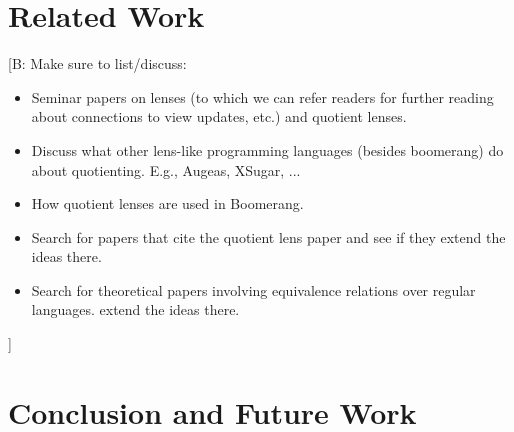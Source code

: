 \documentclass{svproc}
\newcommand{\FINISH}[3]{\ifdraft\textcolor{#1}{[#2: #3]}\fi}
\newcommand{\bcp}[1]{\FINISH{dkred}{B}{#1}}
\begin{document}
\section{Related Work}
\label{relwork}

\bcp{Make sure to list/discuss:
  \begin{itemize}
  \item Seminar papers on lenses (to which we can refer readers for further
    reading about connections to view updates, etc.) and quotient lenses.
  \item Discuss what other lens-like programming languages (besides
    boomerang) do about quotienting.  E.g., Augeas, XSugar, ...
  \item How quotient lenses are used in Boomerang.
  \item Search for papers that cite the quotient lens paper and see if they
  extend the ideas there.
  \item Search for theoretical papers involving equivalence relations over
  regular languages. 
    extend the ideas there.
  \end{itemize}
}

\section{Conclusion and Future Work}
\label{concl}
\end{document}
